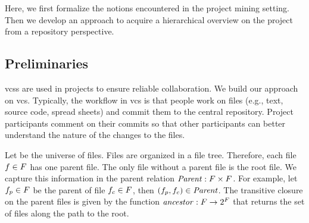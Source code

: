 \label{sec:bpm2015concept}
Here, we first formalize the notions encountered in the project mining setting. Then we develop an approach to acquire a hierarchical overview on the project from a repository perspective.

\subsection{Preliminaries}
\glspl{vcs} are used in projects to ensure reliable collaboration. We build our approach on \gls{vcs}. Typically, the workflow in \gls{vcs} is that people work on files (e.g., text, source code, spread sheets) and commit them to the central repository. Project participants comment on their commits so that other participants can better understand the nature of the changes to the files.

Let \Files be the universe of files. Files are organized in a file tree. Therefore, each file $f \in F$ has one parent file. The only file without a parent file is the root file. We capture this information in the parent relation $\mathit{Parent} : F \times F$. For example, let $f_p \in F$ be the parent of file $f_c \in F$, then $(f_p, f_c) \in \mathit{Parent}$.
The transitive closure on the parent files is given by the function $\mathit{ancestor} : F \rightarrow 2^{F}$ that returns the set of files along the path to the root.

